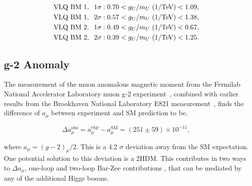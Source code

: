 \begin{align}
\begin{split}
\text{VLQ BM 1}, \hspace{0.2cm} 1\sigma&: 0.70 < g_{U}/m_{U} \text{ (1/TeV)} < 1.09, \\
\text{VLQ BM 1}, \hspace{0.2cm} 2\sigma&: 0.57 < g_{U}/m_{U} \text{ (1/TeV)} < 1.38, \\
\text{VLQ BM 2}, \hspace{0.2cm} 1\sigma&: 0.49 < g_{U}/m_{U} \text{ (1/TeV)} < 0.67, \\
\text{VLQ BM 2}, \hspace{0.2cm} 2\sigma&: 0.39 < g_{U}/m_{U} \text{ (1/TeV)} < 1.25.
\end{split}
\end{align}

\subsection{g-2 Anomaly}
\label{sec:gm2_anomaly}

The measurement of the muon anomalous magnetic moment from the Fermilab National Accelerator Laboratory muon g-2 experiment~\cite{Muong-2:2021ojo}, combined with earlier results from the Brookhaven National Laboratory E821 measurement~\cite{Muong-2:2006rrc}, finds the difference of $a_\mu$ between experiment and \ac{SM} prediction to be,

\begin{equation}
\Delta a_{\mu}^{\text{obs}} = a_{\mu}^{\text{exp}} - a_{\mu}^{\text{SM}} = (251 \pm 59) \times 10^{-11},
\end{equation}

where $a_{\mu}=(g-2)_{\mu}/2$. 
This is a 4.2 $\sigma$ deviation away from the \ac{SM} expectation.
One potential solution to this deviation is a \ac{2HDM}.
This contributes in two ways to $\Delta a_{\mu}$, one-loop and two-loop Bar-Zee contributions \cite{Ilisie:2015tra,Barr:1990vd}, that can be mediated by any of the additional Higgs bosons. \\

